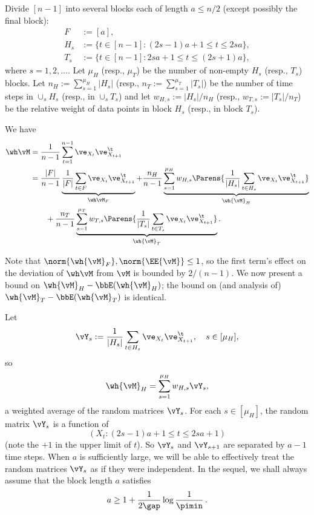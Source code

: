 Divide $[n-1]$ into several blocks each of length $a \leq n/2$ (except 
possibly the final block):
\begin{align*}
  F & := [a] , \\
  H_s & := \{ t \in [n-1] : (2s-1)a + 1 \leq t \leq 2sa \} , \\
  T_s & := \{ t \in [n-1] : 2sa + 1 \leq t \leq (2s+1) a \} ,
\end{align*}
where $s=1,2,\dots$.
Let $\mu_H$ (resp., $\mu_T$) be the number of non-empty $H_s$ (resp., $T_s$)
blocks.
Let $n_H := \sum_{s=1}^{\mu_H} |H_s|$ (resp., $n_T := \sum_{s=1}^{\mu_T}|T_s|$)
be the number of time steps in $\cup_s H_s$ (resp., in $\cup_s T_s$) and let
 $w_{H,s} := |H_s|/n_H$ (resp., $w_{T,s} := |T_s|/n_T$) be the relative weight of data points in block $H_s$
 (resp., in block $T_s$).

We have
\begin{align*}
  \wh\vM
  & = \frac1{n-1} \sum_{t=1}^{n-1} \ve_{X_t} \ve_{X_{t+1}}^\t \\
  & = \frac{|F|}{n-1} 
    \underbrace{
      \frac{1}{|F|} \sum_{t\in F} \ve_{X_t} \ve_{X_{t+1}}^\t
     }_{\wh\vM_F} +
  \frac{n_H}{n-1}
  \underbrace{
    \sum_{s=1}^{\mu_H} w_{H,s}
    \Parens{
      \frac1{|H_s|} \sum_{t \in H_s} \ve_{X_t} \ve_{X_{t+1}}^\t
    }
  }_{\wh{\vM}_H}\\
  & \qquad
  + \frac{n_T}{n-1}
  \underbrace{
    \sum_{s=1}^{\mu_T} w_{T,s}
    \Parens{
      \frac1{|T_s|} \sum_{t \in T_s} \ve_{X_t} \ve_{X_{t+1}}^\t
    }
  }_{\wh{\vM}_T}
  .
\end{align*}

Note that $\norm{\wh{\vM}_F},\norm{\EE{\vM}}\le 1$, so the first term's effect on the deviation of $\wh \vM$ from $\vM$ is bounded by $2/(n-1)$.
We now present a bound on $\wh{\vM}_H - \bbE(\wh{\vM}_H)$; the bound on (and analysis of)
 $\wh{\vM}_T - \bbE(\wh{\vM}_T)$ is identical.

Let
\[
  \vY_s := \frac1{|H_s|} \sum_{t \in H_s} \ve_{X_t} \ve_{X_{t+1}}^\t ,
  \quad s \in [\mu_H] ,
\]
so
\[
  \wh{\vM}_H = \sum_{s=1}^{\mu_H} w_{H,s} \vY_s ,
\]
a weighted average of the random matrices $\vY_s$.
For each $s \in [\mu_H]$, the random matrix $\vY_s$ is a function of
\[ (X_t : (2s-1)a + 1 \leq t \leq 2sa + 1) \]
(note the $+1$ in the upper limit of $t$).
So $\vY_s$ and $\vY_{s+1}$ are separated by $a-1$ time steps.
When $a$ is sufficiently large, we will be able to effectively treat
the random matrices $\vY_s$ as if they were independent.
In the sequel, we shall always assume that the block length $a$
satisfies
\begin{equation}
  \label{eq:block-length}
  a \geq
   1 + \frac{1}{2\gap} \log \frac1{\pimin}\,.
\end{equation}

